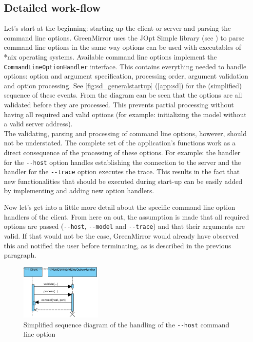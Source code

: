 \documentclass[a4paper]{article}
\begin{document}
\subsection{Detailed work-flow}\label{subsec:detailedworkflow}
Let's start at the beginning: starting up the client or server and parsing the command line options. GreenMirror uses the JOpt Simple library (see \cite{joptsimple}) to parse command line options in the same way options can be used with executables of *nix operating systems. Available command line options implement the \lstinline{CommandLineOptionHandler} interface. This contains everything needed to handle options: option and argument specification, processing order, argument validation and option processing. See \cref{fig:sd_generalstartup} (\cref{app:sd}) for the (simplified) sequence of these events. From the diagram can be seen that the options are all validated before they are processed. This prevents partial processing without having all required and valid options (for example: initializing the model without a valid server address).\\
The validating, parsing and processing of command line options, however, should not be understated. The complete set of the application's functions work as a direct consequence of the processing of these options. For example: the handler for the \lstinline{--host} option handles establishing the connection to the server and the handler for the \lstinline{--trace} option executes the trace. This results in the fact that new functionalities that should be executed during start-up can be easily added by implementing and adding new option handlers.

Now let's get into a little more detail about the specific command line option handlers of the client. From here on out, the assumption is made that all required options are passed (\lstinline{--host}, \lstinline{--model} and \lstinline{--trace}) and that their arguments are valid. If that would not be the case, GreenMirror would already have observed this and notified the user before terminating, as is described in the previous paragraph.

\begin{figure}\vspace{-20pt}
  \begin{center}
    \includegraphics[width=0.36\textwidth]{diagrams/SD_client_host}
  \end{center}
  \vspace{-20pt}\caption{Simplified sequence diagram of the handling of the \lstinline{--host} command line option}\vspace{-15pt}
  \label{fig:sd_client_host}
\end{figure}
\end{document}
